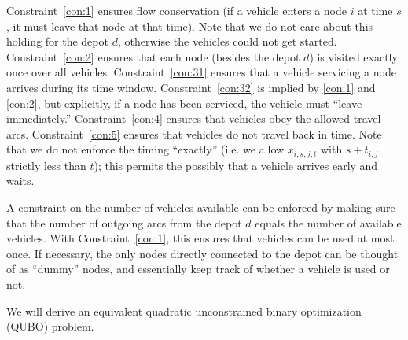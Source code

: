\documentclass[11pt]{article}
\theoremstyle{definition}
\newcommand{\0}{\mathbf{0}}
\begin{document}
Constraint~\eqref{con:1} ensures flow conservation (if a vehicle enters a node $i$ at time $s$, it must leave that node at that time).
Note that we do not care about this holding for the depot $d$, otherwise the vehicles could not get started.
Constraint~\eqref{con:2} ensures that each node (besides the depot $d$) is visited exactly once over all vehicles.
Constraint~\eqref{con:31} ensures that a vehicle servicing a node arrives during its time window.
Constraint~\eqref{con:32} is implied by \eqref{con:1} and \eqref{con:2}, but explicitly, if a node has been serviced, the vehicle must ``leave immediately.''
Constraint~\eqref{con:4} ensures that vehicles obey the allowed travel arcs.
Constraint~\eqref{con:5} ensures that vehicles do not travel back in time.
Note that we do not enforce the timing ``exactly'' (i.e. we allow $x_{i,s,j,t}$ with $s + t_{i,j}$ strictly less than $t$);
this permits the possibly that a vehicle arrives early and waits.

A constraint on the number of vehicles available can be enforced by making sure that the number of outgoing arcs from the depot $d$ equals the number of available vehicles.
With Constraint~\eqref{con:1}, this ensures that vehicles can be used at most once.
If necessary, the only nodes directly connected to the depot can be thought of as ``dummy'' nodes, and essentially keep track of whether a vehicle is used or not.

We will derive an equivalent quadratic unconstrained binary optimization (QUBO) problem.
\end{document}
